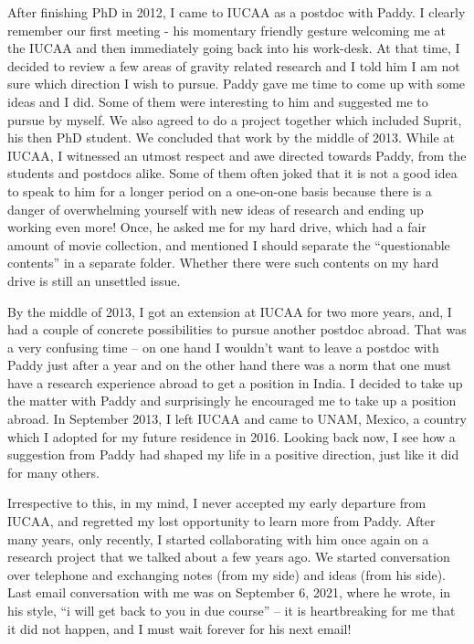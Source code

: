\documentclass[prd, preprint, longbibliography, 12pt]{revtex4-2}
\begin{document}
After finishing PhD in 2012, I came to IUCAA as a postdoc with Paddy. I clearly remember our first meeting - his momentary friendly gesture welcoming me at the IUCAA and then immediately going back into his work-desk. At that time, I decided to review a few areas of gravity related research and I told him I am not sure which direction I wish to pursue. Paddy gave me time to come up with some ideas and I did. Some of them were interesting to him and suggested me to pursue by myself. We also agreed to do a project together which included Suprit, his then PhD student. We concluded that work by the middle of 2013. While at IUCAA, I witnessed an utmost respect and awe directed towards Paddy, from the students and postdocs alike. Some of them often joked that it is not a good idea to speak to him for a longer period on a one-on-one basis because there is a danger of overwhelming yourself with new ideas of research and ending up working even more! Once, he asked me for my hard drive, which had  a fair amount of movie collection, and mentioned I should separate the “questionable contents” in a separate folder. Whether there were such contents on my hard drive is still an unsettled issue. 

By the middle of 2013, I got an extension at IUCAA for two more years, and, I had a couple of concrete possibilities to pursue another postdoc abroad. That was a very confusing time – on one hand I wouldn’t want to leave a postdoc with Paddy just after a year and on the other hand there was a norm that one must have a research experience abroad to get a position in India. I decided to take up the matter with Paddy and surprisingly he encouraged me to take up a position abroad. In September 2013, I left IUCAA and came to UNAM, Mexico, a country which I adopted for my future residence in 2016. Looking back now, I see how a suggestion from Paddy had shaped my life in a positive direction, just like it did for many others.

Irrespective to this, in my mind, I never accepted my early departure from IUCAA, and regretted my lost opportunity to learn more from Paddy. After many years, only recently, I started collaborating with him once again on a research project that we talked about a few years ago. We started conversation over telephone and exchanging notes (from my side) and ideas (from his side). Last email conversation with me was on September 6, 2021, where he wrote, in his style, “i will get back to you in due course” – it is heartbreaking for me that it did not happen, and I must wait forever for his next email!
\end{document}
